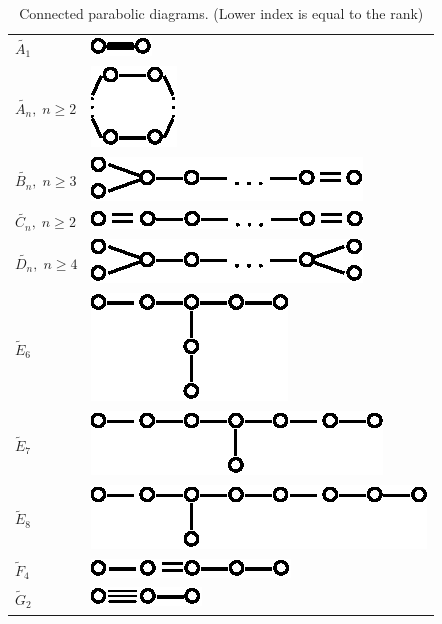 \begin{enumerate}
{
\renewcommand{\arraystretch}{1.2}
\tabcolsep=10pt
\begin{longtable}{@{}l@{\qquad\quad}l@{}}
\caption{Connected parabolic diagrams. (Lower index is equal to the rank)}\\
$\tilde{A_1}$ & {\includegraphics{345a1.eps}}\\
$\tilde{A_n}, \; n \geqslant 2$ & {\includegraphics{345a2.eps}}\\
$\tilde{B_n}, \; n \geqslant 3$ & {\includegraphics{345a3.eps}}\\
$\tilde{C_n}, \; n \geqslant 2$ & {\includegraphics{345a4.eps}}\\
$\tilde{D_n}, \; n \geqslant 4$ & {\includegraphics{345a5.eps}}\\
$\tilde{E}_6$ & {\includegraphics{345a6.eps}}\\
$\tilde{E}_7$ & {\includegraphics{345a7.eps}}\\
$\tilde{E}_8$ & {\includegraphics{345a8.eps}}\\
$\tilde{F}_4$ & {\includegraphics{345a9.eps}}\\
$\tilde{G}_2$ & {\includegraphics{345a10.eps}}\\
\end{longtable}}\relax



\end{enumerate}
